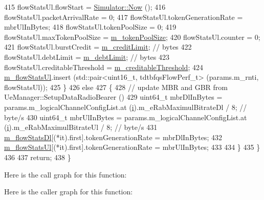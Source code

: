 \begin{DoxyCode}
415           flowStatsUl.flowStart = \hyperlink{classns3_1_1Simulator_ac3178fa975b419f7875e7105be122800}{Simulator::Now} ();
416           flowStatsUl.packetArrivalRate = 0;
417           flowStatsUl.tokenGenerationRate = mbrUlInBytes;
418           flowStatsUl.tokenPoolSize = 0;
419           flowStatsUl.maxTokenPoolSize = \hyperlink{classns3_1_1TdTbfqFfMacScheduler_ac14d4dbc811afa558ad1b7fc125b188b}{m\_tokenPoolSize};
420           flowStatsUl.counter = 0;
421           flowStatsUl.burstCredit = \hyperlink{classns3_1_1TdTbfqFfMacScheduler_a4fcf66ab5e783305bad38c4667f2cfd0}{m\_creditLimit};  \textcolor{comment}{// bytes}
422           flowStatsUl.debtLimit = \hyperlink{classns3_1_1TdTbfqFfMacScheduler_a9c3d40d1117e3afd1dbb4747008d256e}{m\_debtLimit};  \textcolor{comment}{// bytes}
423           flowStatsUl.creditableThreshold = \hyperlink{classns3_1_1TdTbfqFfMacScheduler_a776a405971c9f74b3ad96379a9aa7abe}{m\_creditableThreshold};
424           \hyperlink{classns3_1_1TdTbfqFfMacScheduler_ad4ebe2d2a182a088507ade045b583903}{m\_flowStatsUl}.insert (std::pair<uint16\_t, tdtbfqsFlowPerf\_t> (params.m\_rnti, 
      flowStatsUl));
425         \}
426       \textcolor{keywordflow}{else}
427         \{
428           \textcolor{comment}{// update MBR and GBR from UeManager::SetupDataRadioBearer ()}
429           uint64\_t mbrDlInBytes = params.m\_logicalChannelConfigList.at (\hyperlink{bernuolliDistribution_8m_a6f6ccfcf58b31cb6412107d9d5281426}{i}).m\_eRabMaximulBitrateDl / 8;   \textcolor{comment}{
      // byte/s}
430           uint64\_t mbrUlInBytes = params.m\_logicalChannelConfigList.at (\hyperlink{bernuolliDistribution_8m_a6f6ccfcf58b31cb6412107d9d5281426}{i}).m\_eRabMaximulBitrateUl / 8;   \textcolor{comment}{
      // byte/s}
431           \hyperlink{classns3_1_1TdTbfqFfMacScheduler_a077474dfdd0b794b6e274954e049e0c4}{m\_flowStatsDl}[(*it).first].tokenGenerationRate =  mbrDlInBytes;
432           \hyperlink{classns3_1_1TdTbfqFfMacScheduler_ad4ebe2d2a182a088507ade045b583903}{m\_flowStatsUl}[(*it).first].tokenGenerationRate =  mbrUlInBytes;
433 
434         \}
435     \}
436 
437   \textcolor{keywordflow}{return};
438 \}
\end{DoxyCode}


Here is the call graph for this function\+:




Here is the caller graph for this function\+:


